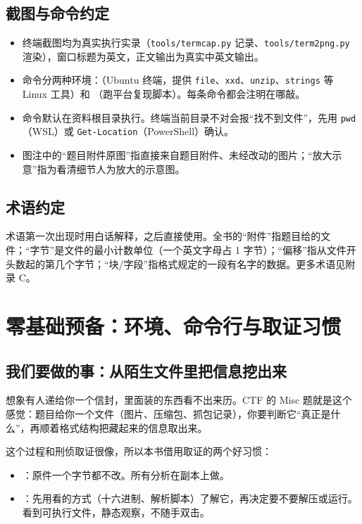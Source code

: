 \documentclass[UTF8,12pt,oneside]{ctexbook}
\begin{document}
\section*{截图与命令约定}
\begin{itemize}
\item 终端截图均为真实执行实录（\verb|tools/termcap.py| 记录、\verb|tools/term2png.py| 渲染），窗口标题为英文，正文输出为真实中英文输出。
\item 命令分两种环境：（Ubuntu 终端，提供 \verb|file|、\verb|xxd|、\verb|unzip|、\verb|strings| 等 Linux 工具）和 （跑平台复现脚本）。每条命令都会注明在哪敲。
\item 命令默认在资料根目录执行。终端当前目录不对会报“找不到文件”，先用 \verb|pwd|（WSL）或 \verb|Get-Location|（PowerShell）确认。
\item 图注中的“题目附件原图”指直接来自题目附件、未经改动的图片；“放大示意”指为看清细节人为放大的示意图。
\end{itemize}

\section*{术语约定}
术语第一次出现时用白话解释，之后直接使用。全书的“附件”指题目给的文件；“字节”是文件的最小计数单位（一个英文字母占 1 字节）；“偏移”指从文件开头数起的第几个字节；“块/字段”指格式规定的一段有名字的数据。更多术语见附录 C。

\tableofcontents
\mainmatter

\chapter{零基础预备：环境、命令行与取证习惯}
\label{chap:prep}

\section{我们要做的事：从陌生文件里把信息挖出来}
想象有人递给你一个信封，里面装的东西看不出来历。CTF 的 Misc 题就是这个感觉：题目给你一个文件（图片、压缩包、抓包记录），你要判断它“真正是什么”，再顺着格式结构把藏起来的信息取出来。

这个过程和刑侦取证很像，所以本书借用取证的两个好习惯：
\begin{itemize}
\item {}：原件一个字节都不改。所有分析在副本上做。
\item {}：先用看的方式（十六进制、解析脚本）了解它，再决定要不要解压或运行。看到可执行文件，静态观察，不随手双击。
\end{itemize}
\end{document}
